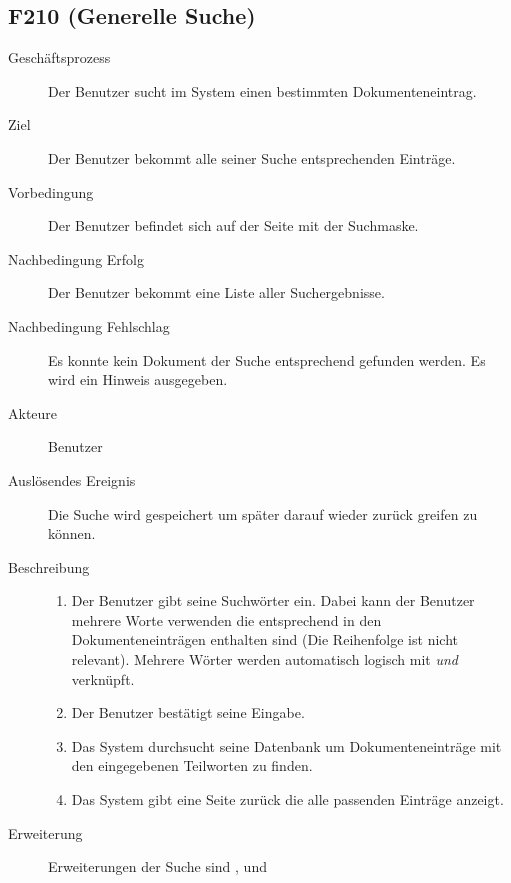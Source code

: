 \subsection{F210 (Generelle Suche)}
\label{F:Suche}
\begin{description}
  \item[Geschäftsprozess]Der Benutzer sucht im System einen bestimmten Dokumenteneintrag.
  \item[Ziel]Der Benutzer bekommt alle seiner Suche entsprechenden Einträge.
  \item[Vorbedingung]Der Benutzer befindet sich auf der Seite mit der Suchmaske.
  \item[Nachbedingung Erfolg]Der Benutzer bekommt eine Liste aller Suchergebnisse.
  \item[Nachbedingung Fehlschlag]Es konnte kein Dokument der Suche entsprechend gefunden werden. Es wird ein Hinweis ausgegeben.
  \item[Akteure]Benutzer
  \item[Auslösendes Ereignis]Die Suche wird gespeichert um später darauf wieder zurück greifen zu können.
  \item[Beschreibung]\hfill
    \begin{enumerate}
      \item Der Benutzer gibt seine Suchwörter ein. Dabei kann der Benutzer mehrere Worte verwenden die entsprechend in den Dokumenteneinträgen enthalten sind (Die Reihenfolge ist nicht relevant). Mehrere Wörter werden automatisch logisch mit \emph{und} verknüpft.
      \item Der Benutzer bestätigt seine Eingabe.
      \item Das System durchsucht seine Datenbank um Dokumenteneinträge mit den eingegebenen Teilworten zu finden.
      \item Das System gibt eine Seite zurück die alle passenden Einträge anzeigt.
    \end{enumerate}
    \item[Erweiterung]Erweiterungen der Suche sind ,  und 
\end{description}


